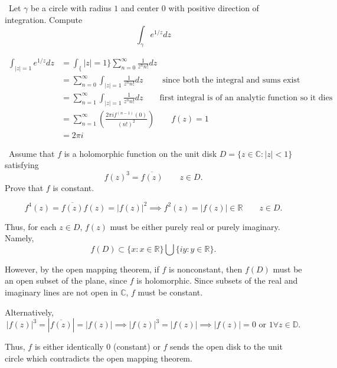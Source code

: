 \documentclass[12pt]{Homework}
\begin{document}
\begin{problem} $\,$
Let $\gamma$ be a circle with radius $1$ and center $0$ with positive direction of integration. Compute $$\int_\gamma e^{1/z}dz$$
\end{problem}


\begin{solution}$\,$
\begin{align*}
    \int_{|z|=1}e^{1/z}dz&=\int_\{|z|=1\}\sum_{n=0}^\infty\frac{1}{z^nn!}dz\\
    &=\sum_{n=0}^\infty\int_{|z|=1}\frac{1}{z^nn!}dz\qquad\text{ since both the integral and sums exist}\\
    &=\sum_{n=1}^\infty\int_{|z|=1}\frac{1}{z^nn!}dz\qquad\text{first integral is of an analytic function so it dies}\\
    &=\sum_{n=1}^\infty\left(\frac{2\pi if^{(n-1)}(0)}{(n!)^2}\right)\qquad f(z)=1\\
    &=2\pi i
\end{align*}
\end{solution}
\newpage



\begin{problem} $\,$
Assume that $f$ is a holomorphic function on the unit disk $D=\{z\in\mathbb{C}:|z|<1\}$ satisfying $$f(z)^3=\overline{f(z)}\qquad z\in D.$$ Prove that $f$ is constant.
\end{problem}

\begin{solution}$\,$
$$f^4(z)=\overline{f(z)}f(z)=|f(z)|^2\implies f^2(z)=|f(z)|\in\mathbb{R}\qquad z\in D.$$

Thus, for each $z\in D$, $f(z)$ must be either purely real or purely imaginary. Namely, $$f(D)\subset\{x:x\in\mathbb{R}\}\bigcup\{iy:y\in\mathbb{R}\}.$$

However, by the open mapping theorem, if $f$ is nonconstant, then $f(D)$ must be an open subset of the plane, since $f$ is holomorphic. Since subsets of the real and imaginary lines are not open in $\mathbb{C}$, $f$ must be constant. 

\begin{mybox}
Alternatively, $$|f(z)|^3=|\overline{f(z)}|=|f(z)|\implies |f(z)|^3=|f(z)|\implies |f(z)|=0\text{ or }1\forall z\in\mathbb{D}.$$

Thus, $f$ is either identically $0$ (constant) or $f$ sends the open disk to the unit circle which contradicts the open mapping theorem.
\end{mybox}
\end{solution}
\newpage
\end{document}
